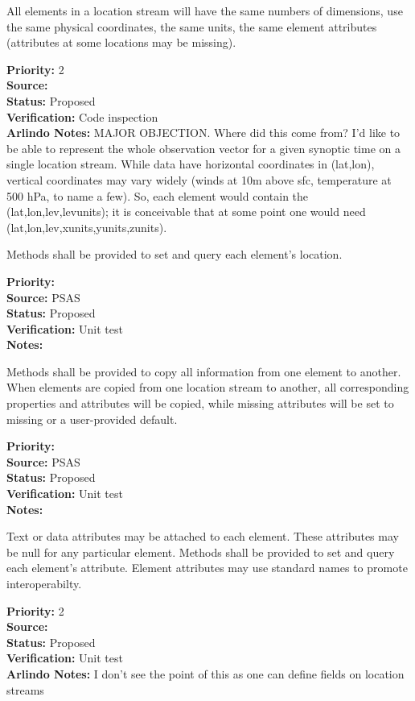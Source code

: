 All elements in a location stream will have the same numbers of dimensions, use the
same physical coordinates, the same units, the same element attributes (attributes at
some locations may be missing).
\begin{reqlist}
{\bf Priority:} 2 \\
{\bf Source:} \\
{\bf Status:} Proposed \\
{\bf Verification:} Code inspection \\
{\bf Arlindo Notes:} MAJOR OBJECTION. Where did this come from? I'd like to be able to represent the whole observation vector for a given synoptic time on a single location stream. While data have horizontal coordinates in (lat,lon), vertical coordinates may vary widely (winds at 10m above sfc, temperature at 500 hPa, to name a few). So, each element would contain the (lat,lon,lev,levunits); it is conceivable that at  some point one would need (lat,lon,lev,xunits,yunits,zunits).
\end{reqlist}

Methods shall be provided to set and query each element's location.
\begin{reqlist}
{\bf Priority:} \\
{\bf Source:} PSAS\\
{\bf Status:} Proposed \\
{\bf Verification:} Unit test \\
{\bf Notes:} 
\end{reqlist}

Methods shall be provided to copy all information from one element to another. 
When elements are copied from one location stream to another, all corresponding
properties and attributes will be copied, while missing attributes will be
set to missing or a user-provided default.
\begin{reqlist}
{\bf Priority:} \\
{\bf Source:} PSAS\\
{\bf Status:} Proposed \\
{\bf Verification:} Unit test \\
{\bf Notes:} 
\end{reqlist}

Text or data attributes may be attached to each element.  These
attributes may be null for any particular element.  Methods shall be provided to set
and query each element's attribute.  Element attributes may use standard names to
promote interoperabilty.
\begin{reqlist}
{\bf Priority:} 2 \\
{\bf Source:} \\
{\bf Status:} Proposed \\
{\bf Verification:} Unit test \\
{\bf Arlindo Notes:} I don't see the point of this as one can define fields on location streams 
\end{reqlist}

